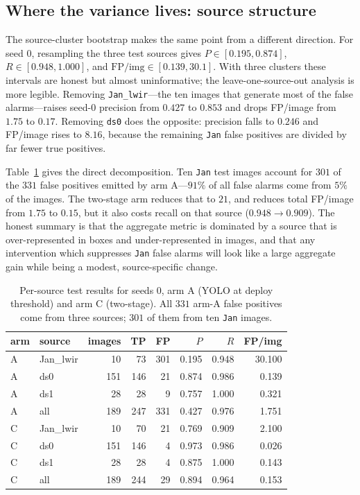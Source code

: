 \subsection{Where the variance lives: source structure}
\label{sec:persource}

The source-cluster bootstrap makes the same point from a different direction. For
seed 0, resampling the three test sources gives $P \in [0.195, 0.874]$,
$R \in [0.948, 1.000]$, and $\mathrm{FP/img} \in [0.139, 30.1]$. With three
clusters these intervals are honest but almost uninformative; the
leave-one-source-out analysis is more legible. Removing \texttt{Jan\_lwir}---the
ten images that generate most of the false alarms---raises seed-0 precision from
$0.427$ to $0.853$ and drops FP/image from $1.75$ to $0.17$. Removing
\texttt{ds0} does the opposite: precision falls to $0.246$ and FP/image rises to
$8.16$, because the remaining \texttt{Jan} false positives are divided by far
fewer true positives.

Table~\ref{tab:persource} gives the direct decomposition. Ten \texttt{Jan} test
images account for $301$ of the $331$ false positives emitted by arm A---$91\%$
of all false alarms come from $5\%$ of the images. The two-stage arm reduces that
to $21$, and reduces total FP/image from $1.75$ to $0.15$, but it also costs
recall on that source ($0.948 \to 0.909$). The honest summary is that the
aggregate metric is dominated by a source that is over-represented in boxes and
under-represented in images, and that any intervention which suppresses
\texttt{Jan} false alarms will look like a large aggregate gain while being a
modest, source-specific change.

\begin{table}[t]
\centering
\small
\caption{Per-source test results for seeds 0, arm A (YOLO at deploy threshold)
and arm C (two-stage). All $331$ arm-A false positives come from three sources;
$301$ of them from ten \texttt{Jan} images.}
\label{tab:persource}
\begin{tabular}{llrrrrrr}
\toprule
arm & source & images & TP & FP & $P$ & $R$ & FP/img \\
\midrule
A & Jan\_lwir & 10 & 73 & 301 & 0.195 & 0.948 & 30.100 \\
A & ds0 & 151 & 146 & 21 & 0.874 & 0.986 & 0.139 \\
A & ds1 & 28 & 28 & 9 & 0.757 & 1.000 & 0.321 \\
A & all & 189 & 247 & 331 & 0.427 & 0.976 & 1.751 \\
\midrule
C & Jan\_lwir & 10 & 70 & 21 & 0.769 & 0.909 & 2.100 \\
C & ds0 & 151 & 146 & 4 & 0.973 & 0.986 & 0.026 \\
C & ds1 & 28 & 28 & 4 & 0.875 & 1.000 & 0.143 \\
C & all & 189 & 244 & 29 & 0.894 & 0.964 & 0.153 \\
\bottomrule
\end{tabular}
\end{table}


